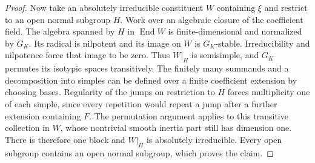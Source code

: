 \documentclass[a4paper,11pt]{article}
\theoremstyle{definition}
\theoremstyle{remark}
\numberwithin{equation}{section}
\begin{document}
\begin{proof}
Now take an absolutely irreducible constituent \(W\) containing
\(\xi\) and restrict to an open normal subgroup \(H\). Work
over an algebraic closure of the coefficient field. The algebra
spanned by \(H\) in \(\operatorname{End}W\) is finite-dimensional
and normalized by \(G_K\). Its radical is nilpotent and its image
on \(W\) is \(G_K\)-stable. Irreducibility and nilpotence force
that image to be zero. Thus \(W|_H\) is semisimple, and \(G_K\)
permutes its isotypic spaces transitively. The finitely many
summands and a decomposition into simples can be defined over
a finite coefficient extension by choosing bases. Regularity
of the jumps on restriction to \(H\) forces multiplicity one
of each simple, since every repetition would repeat a jump after
a further extension containing \(F\). The permutation argument
applies to this transitive collection in \(W\), whose nontrivial
smooth inertia part still has dimension one. There is therefore
one block and \(W|_H\) is absolutely irreducible. Every open
subgroup contains an open normal subgroup, which proves the claim.
\end{proof}
\end{document}
